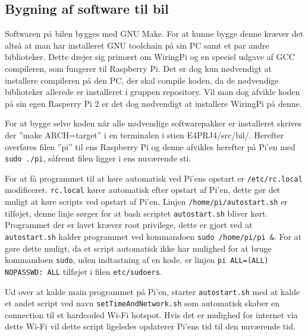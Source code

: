 \subsection{Bygning af software til bil}

Softwaren på bilen bygges med GNU Make\cite{lib:GNU_make}.
For at kunne bygge denne kræver det altså at man har installeret GNU toolchain på sin PC samt et par andre biblioteker.
Dette drejer sig primært om WiringPi\cite{lib:wiringpi} og en speciel udgave af GCC compileren, som fungerer til Raspberry Pi\cite{lib:pi_tools}.
Det er dog kun nødvendigt at installere compileren på den PC, der skal compile koden, da de nødvendige biblioteker allerede er installeret i gruppen repository. 
Vil man dog afvikle koden på sin egen Rasperry Pi 2 er det dog nødvendigt at installere WiringPi på denne.

For at bygge selve koden når alle nødvendige softwarepakker er installeret skrives der ''make ARCH=target'' i en terminalen i stien E4PRJ4/src/bil/.
Herefter overføres filen ''pi'' til ens Raspberry Pi og denne afvikles herefter på Pi'en med \texttt{sudo ./pi}, såfremt filen ligger i ens nuværende sti.

For at få programmet til at køre automatisk ved Pi'ens opstart er \texttt{/etc/rc.local} modificeret. \texttt{rc.local} kører automatisk efter opstart af Pi'en, dette gør det muligt at køre scripts ved opstart af Pi'en. Linjen \texttt{/home/pi/autostart.sh} er tilføjet, denne linje sørger for at bash scriptet \texttt{autostart.sh} bliver kørt. Programmet der er lavet kræver root privilege, dette er gjort ved at \texttt{autostart.sh} kalder programmet ved kommandoen \texttt{sudo /home/pi/pi \&}.
For at gøre dette muligt, da et script automatisk ikke har mulighed for at bruge kommandoen \texttt{sudo}, uden indtastning af en kode, er linjen \texttt{pi ALL=(ALL) NOPASSWD: ALL} tilføjet i filen \texttt{etc/sudoers}.

Ud over at kalde main programmet på Pi'en, starter \texttt{autostart.sh} med at kalde et andet script ved navn \texttt{setTimeAndNetwork.sh} som automatisk skaber en connection til et hardcoded Wi-Fi hotspot. Hvis det er mulighed for internet via dette Wi-Fi vil dette script ligeledes opdaterer Pi'ens tid til den nuværende tid.